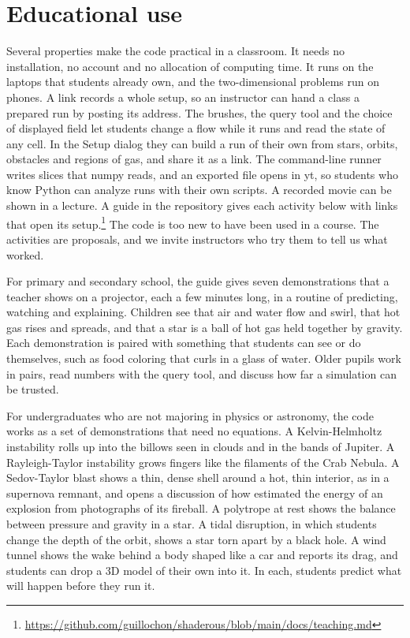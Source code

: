 \documentclass[twocolumn]{aastex701}
\begin{document}
\section{Educational use}
\label{sec:education}

Several properties make the code practical in a classroom. It needs no installation, no account and no allocation of computing time. It runs on the laptops that students already own, and the two-dimensional problems run on phones. A link records a whole setup, so an instructor can hand a class a prepared run by posting its address. The brushes, the query tool and the choice of displayed field let students change a flow while it runs and read the state of any cell. In the Setup dialog they can build a run of their own from stars, orbits, obstacles and regions of gas, and share it as a link. The command-line runner writes slices that numpy reads, and an exported file opens in yt, so students who know Python can analyze runs with their own scripts. A recorded movie can be shown in a lecture. A guide in the repository gives each activity below with links that open its setup.\footnote{\url{https://github.com/guillochon/shaderous/blob/main/docs/teaching.md}} The code is too new to have been used in a course. The activities are proposals, and we invite instructors who try them to tell us what worked.

For primary and secondary school, the guide gives seven demonstrations that a teacher shows on a projector, each a few minutes long, in a routine of predicting, watching and explaining. Children see that air and water flow and swirl, that hot gas rises and spreads, and that a star is a ball of hot gas held together by gravity. Each demonstration is paired with something that students can see or do themselves, such as food coloring that curls in a glass of water. Older pupils work in pairs, read numbers with the query tool, and discuss how far a simulation can be trusted.

For undergraduates who are not majoring in physics or astronomy, the code works as a set of demonstrations that need no equations. A Kelvin-Helmholtz instability rolls up into the billows seen in clouds and in the bands of Jupiter. A Rayleigh-Taylor instability grows fingers like the filaments of the Crab Nebula. A Sedov-Taylor blast shows a thin, dense shell around a hot, thin interior, as in a supernova remnant, and opens a discussion of how \citet{Taylor1950b} estimated the energy of an explosion from photographs of its fireball. A polytrope at rest shows the balance between pressure and gravity in a star. A tidal disruption, in which students change the depth of the orbit, shows a star torn apart by a black hole. A wind tunnel shows the wake behind a body shaped like a car and reports its drag, and students can drop a 3D model of their own into it. In each, students predict what will happen before they run it.
\end{document}
